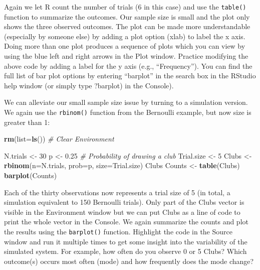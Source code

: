 \documentclass[
]{krantz}
\makeatletter
\newenvironment{Shaded}{\begin{snugshade}}{\end{snugshade}}
\newcommand{\AttributeTok}[1]{\textcolor[rgb]{0.27,0.27,0.27}{#1}}
\newcommand{\CommentTok}[1]{\textcolor[rgb]{0.37,0.37,0.37}{\textit{#1}}}
\newcommand{\DecValTok}[1]{\textcolor[rgb]{0.06,0.06,0.06}{#1}}
\newcommand{\FloatTok}[1]{\textcolor[rgb]{0.06,0.06,0.06}{#1}}
\newcommand{\FunctionTok}[1]{\textcolor[rgb]{0.27,0.27,0.27}{\textbf{#1}}}
\newcommand{\NormalTok}[1]{#1}
\newcommand{\OtherTok}[1]{\textcolor[rgb]{0.37,0.37,0.37}{#1}}
\newenvironment{kframe}{%
\medskip{}
\setlength{\fboxsep}{.8em}
 \def\at@end@of@kframe{}%
 \ifinner\ifhmode%
  \def\at@end@of@kframe{\end{minipage}}%
  \begin{minipage}{\columnwidth}%
 \fi\fi%
 \def\FrameCommand##1{\hskip\@totalleftmargin \hskip-\fboxsep
 \colorbox{shadecolor}{##1}\hskip-\fboxsep
     \hskip-\linewidth \hskip-\@totalleftmargin \hskip\columnwidth}%
 \MakeFramed {\advance\hsize-\width
   \@totalleftmargin\z@ \linewidth\hsize
   \@setminipage}}%
 {\par\unskip\endMakeFramed%
 \at@end@of@kframe}
\renewenvironment{Shaded}{\begin{kframe}}{\end{kframe}}
\makeatother
\begin{document}
Again we let R count the number of trials (6 in this case) and use the \texttt{table()} function to summarize the outcomes. Our sample size is small and the plot only shows the three observed outcomes. The plot can be made more understandable (especially by someone else) by adding a plot option (xlab) to label the x axis. Doing more than one plot produces a sequence of plots which you can view by using the blue left and right arrows in the Plot window. Practice modifying the above code by adding a label for the y axis (e.g., ``Frequency''). You can find the full list of bar plot options by entering ``barplot'' in the search box in the RStudio help window (or simply type ?barplot) in the Console).

We can alleviate our small sample size issue by turning to a simulation version. We again use the \texttt{rbinom()} function from the Bernoulli example, but now size is greater than 1:

\begin{Shaded}
\begin{Highlighting}[]
\FunctionTok{rm}\NormalTok{(}\AttributeTok{list=}\FunctionTok{ls}\NormalTok{()) }\CommentTok{\# Clear Environment}

\NormalTok{N.trials }\OtherTok{\textless{}{-}} \DecValTok{30}
\NormalTok{p }\OtherTok{\textless{}{-}} \FloatTok{0.25} \CommentTok{\# Probability of drawing a club}
\NormalTok{Trial.size }\OtherTok{\textless{}{-}} \DecValTok{5}
\NormalTok{Clubs }\OtherTok{\textless{}{-}} \FunctionTok{rbinom}\NormalTok{(}\AttributeTok{n=}\NormalTok{N.trials, }\AttributeTok{prob=}\NormalTok{p, }\AttributeTok{size=}\NormalTok{Trial.size)}
\NormalTok{Clubs}
\NormalTok{Counts }\OtherTok{\textless{}{-}} \FunctionTok{table}\NormalTok{(Clubs)}
\FunctionTok{barplot}\NormalTok{(Counts)}
\end{Highlighting}
\end{Shaded}

Each of the thirty observations now represents a trial size of 5 (in total, a simulation equivalent to 150 Bernoulli trials). Only part of the Clubs vector is visible in the Environment window but we can put Clubs as a line of code to print the whole vector in the Console. We again summarize the counts and plot the results using the \texttt{barplot()} function. Highlight the code in the Source window and run it multiple times to get some insight into the variability of the simulated system. For example, how often do you observe 0 or 5 Clubs? Which outcome(s) occurs most often (mode) and how frequently does the mode change?
\end{document}
